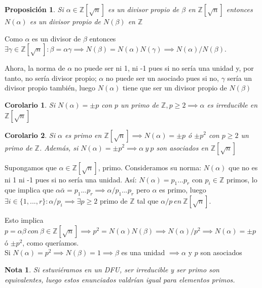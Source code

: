 \documentclass[11pt, a4paper, titlepage]{article}
\makeatletter
\renewenvironment{proof}[1][\proofname] {\vspace{-15pt}\par\pushQED{\qed}\normalfont\topsep6\p@\@plus6\p@\relax\trivlist\item[\hskip\labelsep\it#1\@addpunct{.}]\ignorespaces}{\popQED\endtrivlist\@endpefalse}
\providecommand{\ent}{\mathbb{Z}}
\theoremstyle{theorem-style}
\newtheorem*{nprop}{Proposición}
\newtheorem{ncor}{Corolario}
\theoremstyle{definition-style}
\theoremstyle{remark-style}
\newtheorem*{nota}{Nota}
\theoremstyle{example-style}
\makeatother
\begin{document}
\begin{nprop}
	Si $\alpha \in \ent[\sqrt n]$ es un divisor propio de $\beta$ en $\ent[\sqrt n]$ entonces $N(\alpha)$ es un divisor propio de $N(\beta)$ en $\ent$
\end{nprop}
\begin{proof}
	Como $\alpha$ es un divisor de $\beta$ entonces $\exists \gamma \in \ent[\sqrt n] : \beta = \alpha \gamma \implies N(\beta) = N(\alpha)N(\gamma) \implies N(\alpha)/N(\beta)$.
	
	Ahora, la norma de $\alpha$ no puede ser ni 1, ni -1 pues si no sería una unidad y, por tanto, no sería divisor propio; $\alpha$ no puede ser un asociado pues si no, $\gamma$ sería un divisor propio también, luego $N(\alpha)$ tiene que ser un divisor propio de $N(\beta)$

\end{proof}
\begin{ncor}
	Si $N(\alpha) = \pm p$ con $p $ un primo de $\ent, p\geq 2\implies \alpha$ es irreducible en $\ent[\sqrt n]$ 
\end{ncor}
\begin{ncor}
	Si $\alpha$ es primo en $\ent[\sqrt n]\implies N(\alpha) = \pm p $ ó $\pm p^2$ con $p \geq 2 $ un primo de $\ent$. Además, si $N(\alpha) = \pm p^2 \implies \alpha \ y \ p$ son asociados en $\ent[\sqrt n]$
\end{ncor}
\begin{proof}
	Supongamos que $\alpha \in \ent[\sqrt n]$, primo. Consideramos su norma: $N(\alpha)$ que no es ni 1 ni -1 pues si no sería una unidad. Así: $N(\alpha) = p_1...p_r$ con $p_i\in \ent$ primos, lo que implica que $\alpha \bar{\alpha} = p_1...p_r \implies \alpha/p_1...p_r $ pero $\alpha$ es primo, luego $\exists i \in \{1,...,r\}: \alpha / p_i \implies \exists p \geq 2 $ primo de $\ent$ tal que $\alpha / p \ en \ \ent[\sqrt n]$.
	
	 Esto implica $p = \alpha \beta \ con \ \beta \in \ent[\sqrt n] \implies p^2 = N(\alpha) N(\beta) \implies N(\alpha)/p^2 \implies N(\alpha) = \pm p$ ó $\pm p^2$, como queríamos.\\
	 Si $N(\alpha) = p^2 \implies N(\beta) = 1 \implies \beta$ es una unidad $\implies \alpha$ y $p$ son asociados
\end{proof}
\begin{nota}
	Si estuviéramos en un DFU, ser irreducible y ser primo son equivalentes, luego estos enunciados valdrían igual para elementos primos.
\end{nota}
\end{document}
